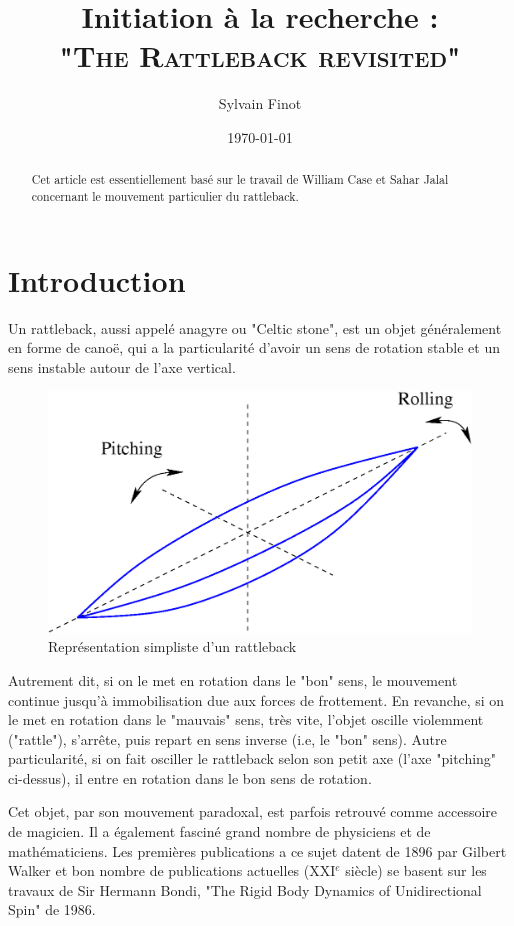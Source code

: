 \documentclass[12pt,a4paper]{article}
\author{Sylvain Finot}
\title{Initiation à la recherche :\\[5pt] \scshape "The Rattleback revisited"}
\date{\today}
\begin{document}
	\maketitle
	\thispagestyle{firststyle}
	\begin{abstract}
		Cet article est essentiellement basé sur le travail de William Case et Sahar Jalal concernant le mouvement particulier du rattleback.
	\end{abstract}
	\section{Introduction}
	Un rattleback, aussi appelé anagyre ou "Celtic stone", est un objet généralement en forme de canoë, qui a la particularité d'avoir un sens de rotation stable et un sens instable autour de l'axe vertical.
	\begin{figure}[h]
		\centering
		\includegraphics[scale=0.2]{Rolling-pitching}
		\caption[]{Représentation simpliste d'un rattleback}
		\label{fig:rolling-pitching}
	\end{figure}
	
	Autrement dit, si on le met en rotation dans le "bon" sens, le mouvement continue jusqu'à immobilisation due aux forces de frottement. En revanche, si on le met en rotation dans le "mauvais" sens, très vite, l'objet oscille violemment ("rattle"), s'arrête, puis repart en sens inverse (i.e, le "bon" sens). Autre particularité, si on fait osciller le rattleback selon son petit axe (l'axe "pitching" ci-dessus), il entre en rotation dans le bon sens de rotation.
	
	Cet objet, par son mouvement paradoxal, est parfois retrouvé comme accessoire de magicien.
	Il a également fasciné grand nombre de physiciens et de mathématiciens. Les premières publications a ce sujet datent de 1896 par Gilbert Walker et bon nombre de publications actuelles (XXI$^{e}$ siècle) se basent sur les travaux de Sir Hermann Bondi, "The Rigid Body Dynamics of Unidirectional Spin" de 1986.
\end{document}
